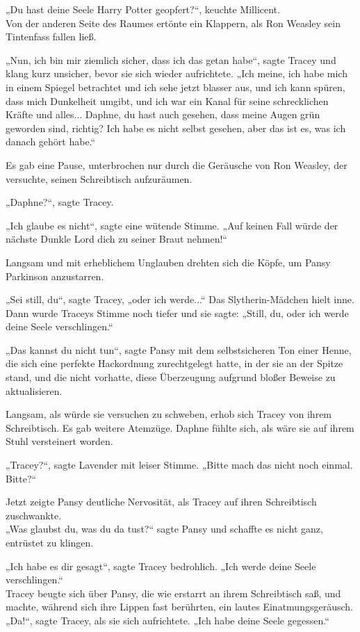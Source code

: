 {„Du hast deine Seele Harry Potter geopfert?“, keuchte Millicent.\\ Von der anderen Seite des Raumes ertönte ein Klappern, als Ron Weasley sein Tintenfass fallen ließ.

„Nun, ich bin mir ziemlich sicher, dass ich das getan habe“, sagte Tracey und klang kurz unsicher, bevor sie sich wieder aufrichtete. „Ich meine, ich habe mich in einem Spiegel betrachtet und ich sehe jetzt blasser aus, und ich kann spüren, dass mich Dunkelheit umgibt, und ich war ein Kanal für seine schrecklichen Kräfte und alles... Daphne, du hast auch gesehen, dass meine Augen grün geworden sind, richtig? Ich habe es nicht selbst gesehen, aber das ist es, was ich danach gehört habe.“

Es gab eine Pause, unterbrochen nur durch die Geräusche von Ron Weasley, der versuchte, seinen Schreibtisch aufzuräumen.

„Daphne?“, sagte Tracey.

„Ich glaube es nicht“, sagte eine wütende Stimme. „Auf keinen Fall würde der nächste Dunkle Lord dich zu seiner Braut nehmen!“

Langsam und mit erheblichem Unglauben drehten sich die Köpfe, um Pansy Parkinson anzustarren.

„Sei still, du“, sagte Tracey, „oder ich werde...“ Das Slytherin-Mädchen hielt inne. Dann wurde Traceys Stimme noch tiefer und sie sagte: „Still, du, oder ich werde deine Seele verschlingen.“

„Das kannst du nicht tun“, sagte Pansy mit dem selbstsicheren Ton einer Henne, die sich eine perfekte Hackordnung zurechtgelegt hatte, in der sie an der Spitze stand, und die nicht vorhatte, diese Überzeugung aufgrund bloßer Beweise zu aktualisieren.

Langsam, als würde sie versuchen zu schweben, erhob sich Tracey von ihrem Schreibtisch. Es gab weitere Atemzüge. Daphne fühlte sich, als wäre sie auf ihrem Stuhl versteinert worden.

„Tracey?“, sagte Lavender mit leiser Stimme. „Bitte mach das nicht noch einmal. Bitte?“

Jetzt zeigte Pansy deutliche Nervosität, als Tracey auf ihren Schreibtisch zuschwankte.\\ „Was glaubst du, was du da tust?“ sagte Pansy und schaffte es nicht ganz, entrüstet zu klingen.

„Ich habe es dir gesagt“, sagte Tracey bedrohlich. „Ich werde deine Seele verschlingen.“\\ Tracey beugte sich über Pansy, die wie erstarrt an ihrem Schreibtisch saß, und machte, während sich ihre Lippen fast berührten, ein lautes Einatmungsgeräusch. „Da!“, sagte Tracey, als sie sich aufrichtete. „Ich habe deine Seele gegessen.“

}
